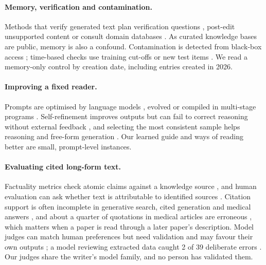 \documentclass{article} %
\begin{document}
\paragraph{Memory, verification and contamination.}
Methods that verify generated text plan verification questions \citep{dhuliawala2024chainofverification}, post-edit unsupported content \citep{Gao2022RarrResearching} or consult domain databases \citep{wang2025geneagent}. As curated knowledge bases are public, memory is also a confound. Contamination is detected from black-box access \citep{Shi2023DetectingPretraining,oren2024proving,golchin2024time,Golchin2025DataContamination}; time-based checks use training cut-offs \citep{Roberts2023DataContamination} or new test items \citep{Jain2024LivecodebenchHolistic,White2024LivebenchChallenging}. We read a memory-only control by creation date, including entries created in 2026.

\paragraph{Improving a fixed reader.}
Prompts are optimised by language models \citep{Zhou2022LargeLanguage,Pryzant2023AutomaticPrompt,Yang2023LargeLanguage}, evolved \citep{Guo2023EvopromptConnecting,Fernando2023PromptbreederSelfreferential,agrawal2026gepa} or compiled in multi-stage programs \citep{Khattab2023DspyCompiling,Opsahlong2024OptimizingInstructions}. Self-refinement improves outputs \citep{Madaan2023SelfrefineIterative} but can fail to correct reasoning without external feedback \citep{Huang2023LargeLanguage}, and selecting the most consistent sample helps reasoning \citep{Wang2022SelfconsistencyImproves} and free-form generation \citep{Chen2023UniversalSelfconsistency}. Our learned guide and ways of reading better are small, prompt-level instances.

\paragraph{Evaluating cited long-form text.}
Factuality metrics check atomic claims against a knowledge source \citep{min2023factscore,wei2024longform,Song2024VeriscoreEvaluating}, and human evaluation can ask whether text is attributable to identified sources \citep{Rashkin2021MeasuringAttribution}. Citation support is often incomplete in generative search, cited generation and medical answers \citep{Liu2023EvaluatingVerifiability,gao2023enabling,wu2025automated}, and about a quarter of quotations in medical articles are erroneous \citep{jergas2015quotation}, which matters when a paper is read through a later paper's description. Model judges can match human preferences \citep{zheng2023judging} but need validation \citep{shankar2024who} and may favour their own outputs \citep{panickssery2024llm}; a model reviewing extracted data caught 2 of 39 deliberate errors \citep{Stewartevans2025ExpeditingData}. Our judges share the writer's model family, and no person has validated them.
\end{document}
